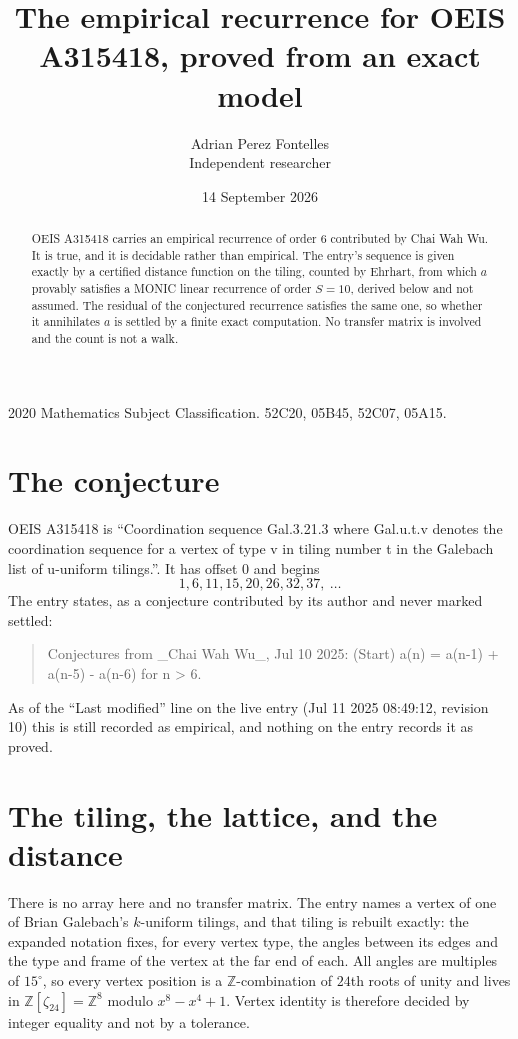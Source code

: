 \documentclass[11pt,a4paper]{article}
\title{The empirical recurrence for OEIS A315418, proved from an exact model}
\author{Adrian Perez Fontelles\\ \small Independent researcher}
\date{14 September 2026}
\theoremstyle{plain}
\theoremstyle{definition}
\begin{document}
\maketitle

\begin{abstract}
OEIS A315418 carries an empirical recurrence of order $6$ contributed by Chai Wah Wu. It is true, and it is
decidable rather than empirical. The entry's sequence is given exactly by a certified distance function on the tiling, counted by Ehrhart, from
which $a$ provably satisfies a MONIC linear recurrence of order $S=10$, derived below and not
assumed. The residual of the conjectured recurrence satisfies the same one, so whether it
annihilates $a$ is settled by a finite exact computation. No transfer matrix is involved and the count is not a walk.
\end{abstract}

\noindent\small 2020 Mathematics Subject Classification. 52C20, 05B45, 52C07, 05A15.\normalsize

\section{The conjecture}

OEIS A315418 is ``Coordination sequence Gal.3.21.3 where Gal.u.t.v denotes the coordination sequence for a vertex of type v in tiling number t in the Galebach list of u-uniform tilings.''. It has offset $0$ and begins
\[
1, 6, 11, 15, 20, 26, 32, 37,\ \dots
\]
The entry states, as a conjecture contributed by its author and never marked settled:
\begin{quote}
Conjectures from \_Chai Wah Wu\_, Jul 10 2025: (Start) a(n) = a(n-1) + a(n-5) - a(n-6) for n > 6.
\end{quote}
As of the ``Last modified'' line on the live entry (Jul 11 2025 08:49:12, revision 10)
this is still recorded as empirical, and nothing on the entry records it as proved.

\section{The tiling, the lattice, and the distance}

There is no array here and no transfer matrix. The entry names a vertex of one of Brian
Galebach's $k$-uniform tilings, and that tiling is rebuilt exactly: the expanded notation
fixes, for every vertex type, the angles between its edges and the type and frame of the
vertex at the far end of each. All angles are multiples of $15^\circ$, so every vertex
position is a $\mathbb{Z}$-combination of $24$th roots of unity and lives in
$\mathbb{Z}[\zeta_{24}]=\mathbb{Z}^{8}$ modulo $x^{8}-x^{4}+1$. Vertex identity is
therefore decided by integer equality and not by a tolerance.
\end{document}
